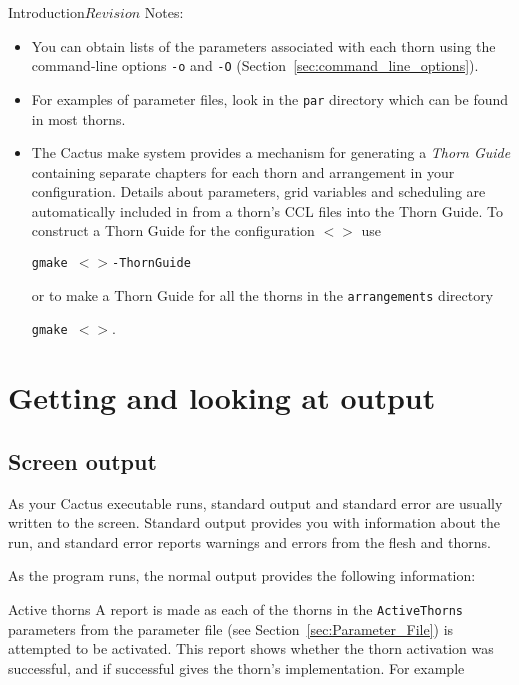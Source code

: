 \begin{cactuspart}{Introduction}{}{$Revision$}
Notes:

\begin{itemize}

\item{} You can obtain lists of the parameters associated with
each thorn using the command-line options \texttt{-o} and \texttt{-O}
(Section~\ref{sec:command_line_options}).

\item{} For examples of parameter files, look in the \texttt{par} directory
        which can be found in most thorns.

\item {}
The Cactus make system provides a mechanism for generating a
\textit{Thorn Guide} containing separate chapters for each thorn and
arrangement in your configuration. 
Details about parameters, grid variables and scheduling are
automatically included in from a thorn's CCL files into the Thorn
Guide. To construct a Thorn Guide for the configuration
\texttt{$<$$>$} use

\texttt{gmake $<$$>$-ThornGuide}

or to make a Thorn Guide for all the thorns in the \texttt{arrangements} directory

\texttt{gmake $<$$>$}.

\end{itemize}



\chapter{Getting and looking at output}


\section{Screen output}

As your Cactus executable runs, standard output and standard error
are usually written to the screen. Standard output provides you
with information about the run, and standard error reports warnings
and errors from the flesh and thorns.

As the program runs, the normal output provides the following information:

\begin{Lentry}

\item [Active thorns]
        A report is made as each of the thorns in the \texttt{ActiveThorns}
parameters from the parameter file (see Section~\ref{sec:Parameter_File})
is attempted to be activated. This report
shows whether the thorn activation was successful, and if successful gives the
thorn's implementation. For example


\end{Lentry}
\end{cactuspart}
